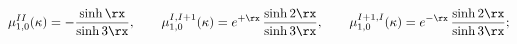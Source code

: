\begin{equation}
\mu_{1,0}^{II}(\kappa)=-\frac{\sinh \rx}{\sinh 3\rx},
\qquad
\mu_{1,0}^{I,I+1}(\kappa)=
e^{+\rx}\,
\frac{\sinh 2\rx}{\sinh 3\rx},
\qquad
\mu_{1,0}^{I+1,I}(\kappa)=e^{-\rx}\,
\frac{\sinh 2\rx}{\sinh 3\rx};
\label{M10}
\end{equation}

